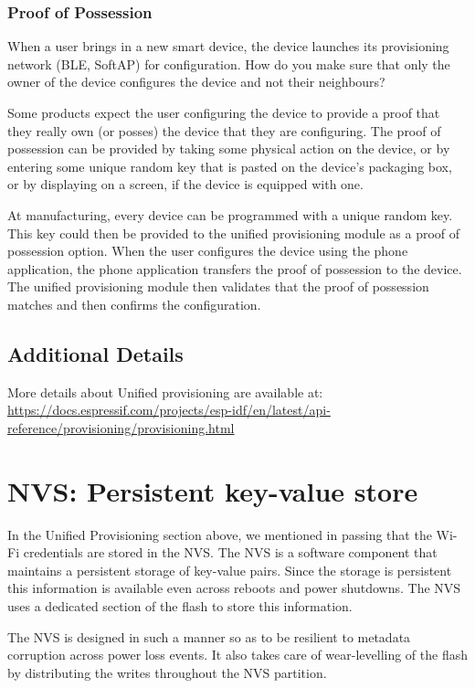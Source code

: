 \documentclass[11pt,fleqn]{book} %
\begin{document}
\subsubsection{Proof of Possession}

When a user brings in a new smart device, the device launches its provisioning network (BLE, SoftAP) for configuration.  How do you make sure that only the owner of the device configures the device and not their neighbours?

Some products expect the user configuring the device to provide a proof that they really own (or posses) the device that they are configuring. The proof of possession can be provided by taking some physical action on the device, or by entering some unique random key that is pasted on the device's packaging box, or by displaying on a screen, if the device is equipped with one.

At manufacturing, every device can be programmed with a unique random key. This key could then be provided to the unified provisioning module as a proof of possession option. When the user configures the device using the phone application, the phone application transfers the proof of possession to the device. The unified provisioning module then validates that the proof of possession matches and then confirms the configuration.

\subsection{Additional Details}

More details about Unified provisioning are available at: \url{https://docs.espressif.com/projects/esp-idf/en/latest/api-reference/provisioning/provisioning.html}

\section{NVS: Persistent key-value store}
In the Unified Provisioning section above, we mentioned in passing that the Wi-Fi credentials are stored in the NVS. The NVS is a software component that maintains a persistent storage of key-value pairs. Since the storage is persistent this information is available even across reboots and power shutdowns. The NVS uses a dedicated section of the flash to store this information.

The NVS is designed in such a manner so as to be resilient to metadata corruption across power loss events. It also takes care of wear-levelling of the flash by distributing the writes throughout the NVS partition.
\end{document}
